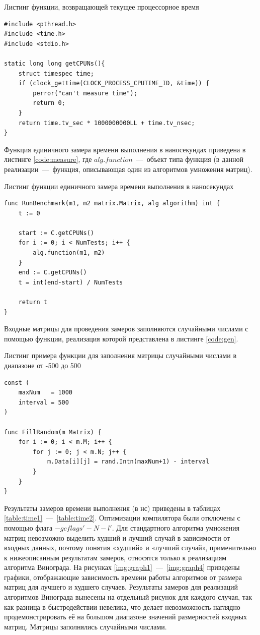 \begin{code}
\caption{Листинг функции, возвращающей текущее процессорное время}
\label{code:cpu}

\begin{verbatim}
#include <pthread.h>
#include <time.h>
#include <stdio.h>

static long long getCPUNs(){
	struct timespec time;
	if (clock_gettime(CLOCK_PROCESS_CPUTIME_ID, &time)) {
		perror("can't measure time");
		return 0;
	}
	return time.tv_sec * 1000000000LL + time.tv_nsec;
}
\end{verbatim}
\end{code}

Функция единичного замера времени выполнения в наносекундах приведена в листинге \ref{code:measure}, где $alg.function$~---~объект типа функция (в данной реализации~---~функция, описывающая один из алгоритмов умножения матриц).

\begin{code}
\caption{Листинг функции единичного замера времени выполнения в наносекундах}
\label{code:measure}
\begin{verbatim}
func RunBenchmark(m1, m2 matrix.Matrix, alg algorithm) int {
	t := 0

	start := C.getCPUNs()
	for i := 0; i < NumTests; i++ {
		alg.function(m1, m2)
	}
	end := C.getCPUNs()
	t = int(end-start) / NumTests

	return t
}

\end{verbatim}
\end{code}

Входные матрицы для проведения замеров заполняются случайными числами с помощью функции, реализация которой представлена в листинге \ref{code:gen}.
\begin{code}
\caption{Листинг примера функции для заполнения матрицы случайными числами в диапазоне от -500 до 500}
\label{code:gen}
\begin{verbatim}
const (
	maxNum   = 1000
	interval = 500
)

func FillRandom(m Matrix) {
	for i := 0; i < m.M; i++ {
		for j := 0; j < m.N; j++ {
			m.Data[i][j] = rand.Intn(maxNum+1) - interval
		}
	}
}
\end{verbatim}
\end{code}

Результаты замеров времени выполнения (в нс) приведены в таблицах \ref{table:time1}~---~\ref{table:time2}. Оптимизации компилятора были отключены с помощью флага $-gcflags '-N -l'$. Для стандартного алгоритма умножения матриц невозможно выделить худший и лучший случай в зависимости от входных данных, поэтому понятия «худший» и «лучший случай», применительно к нижеописанным результатам замеров, относятся только к реализациям алгоритма Винограда. На рисунках \ref{img:graph1}~---~\ref{img:graph4} приведены графики, отображающие зависимость времени работы алгоритмов от размера матриц для лучшего и худшего случаев. Результаты замеров для реализаций алгоритмов Винограда вынесены на отдельный рисунок для каждого случая, так как разница в быстродействии невелика, что делает невозможность наглядно продемонстрировать её на большом диапазоне значений размерностей входных матриц. Матрицы заполнялись случайными числами.

